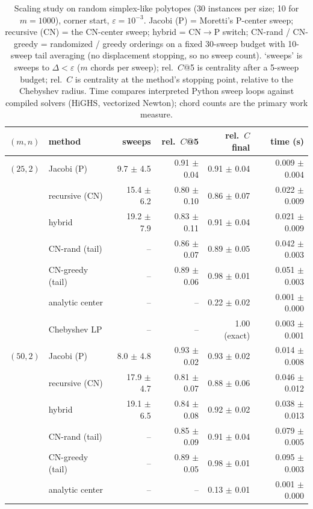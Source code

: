 \begin{table}[!htbp]\centering
\caption{Scaling study on random simplex-like polytopes (30 instances per size; 10 for $m{=}1000$), corner start, $\varepsilon=10^{-3}$. Jacobi (P) = Moretti's P-center sweep; recursive (CN) = the CN-center sweep; hybrid = CN$\to$P switch; CN-rand / CN-greedy = randomized / greedy orderings on a fixed 30-sweep budget with 10-sweep tail averaging (no displacement stopping, so no sweep count). `sweeps' is sweeps to $\Delta<\varepsilon$ ($m$ chords per sweep); rel.\ $C$@5 is centrality after a 5-sweep budget; rel.\ $C$ is centrality at the method's stopping point, relative to the Chebyshev radius. Time compares interpreted Python sweep loops against compiled solvers (HiGHS, vectorized Newton); chord counts are the primary work measure.}
\label{tab:scaling}
\footnotesize
\setlength{\tabcolsep}{4.5pt}
\begin{tabular}{llrrrr}
\toprule
$(m,n)$ & method & sweeps & rel.\ $C$@5 & rel.\ $C$ final & time (s) \\
\midrule
$(25,2)$ & Jacobi (P) & 9.7 $\pm$ 4.5 & 0.91 $\pm$ 0.04 & 0.91 $\pm$ 0.04 & 0.009 $\pm$ 0.004 \\
 & recursive (CN) & 15.4 $\pm$ 6.2 & 0.80 $\pm$ 0.10 & 0.86 $\pm$ 0.07 & 0.022 $\pm$ 0.009 \\
 & hybrid & 19.2 $\pm$ 7.9 & 0.83 $\pm$ 0.11 & 0.91 $\pm$ 0.04 & 0.021 $\pm$ 0.009 \\
 & CN-rand (tail) & -- & 0.86 $\pm$ 0.07 & 0.89 $\pm$ 0.05 & 0.042 $\pm$ 0.003 \\
 & CN-greedy (tail) & -- & 0.89 $\pm$ 0.06 & 0.98 $\pm$ 0.01 & 0.051 $\pm$ 0.003 \\
 & analytic center & -- & -- & 0.22 $\pm$ 0.02 & 0.001 $\pm$ 0.000 \\
 & Chebyshev LP & -- & -- & 1.00 (exact) & 0.003 $\pm$ 0.001 \\
\midrule
$(50,2)$ & Jacobi (P) & 8.0 $\pm$ 4.8 & 0.93 $\pm$ 0.02 & 0.93 $\pm$ 0.02 & 0.014 $\pm$ 0.008 \\
 & recursive (CN) & 17.9 $\pm$ 4.7 & 0.81 $\pm$ 0.07 & 0.88 $\pm$ 0.06 & 0.046 $\pm$ 0.012 \\
 & hybrid & 19.1 $\pm$ 6.5 & 0.84 $\pm$ 0.08 & 0.92 $\pm$ 0.02 & 0.038 $\pm$ 0.013 \\
 & CN-rand (tail) & -- & 0.85 $\pm$ 0.09 & 0.91 $\pm$ 0.04 & 0.079 $\pm$ 0.005 \\
 & CN-greedy (tail) & -- & 0.89 $\pm$ 0.05 & 0.98 $\pm$ 0.01 & 0.095 $\pm$ 0.003 \\
 & analytic center & -- & -- & 0.13 $\pm$ 0.01 & 0.001 $\pm$ 0.000 \\

\end{tabular}
\end{table}
